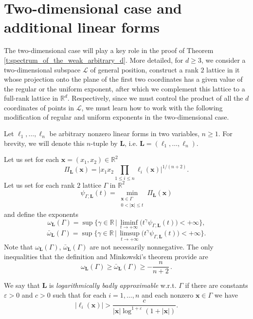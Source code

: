 \documentclass[a4paper,12pt]{article}
\theoremstyle{definition}
\theoremstyle{remark}
\theoremstyle{plain}
\renewcommand{\vec}[1]{\mathbf{#1}}
\renewcommand{\geq}{\geqslant}
\renewcommand{\leq}{\leqslant}
\newcommand{\e}{\varepsilon}
\newcommand{\R}{\mathbb{R}}
\newcommand{\Ga}{\Gamma}
\newcommand{\cL}{\mathcal{L}}
\newcommand{\bL}{\mathbf{L}}
\begin{document}
\section{Two-dimensional case and additional linear forms}\label{sec:2dim_and_additional_forms}


The two-dimensional case will play a key role in the proof of Theorem \ref{t:spectrum_of_the_weak_arbitrary_d}. More detailed, for $d\geq3$, we consider a two-dimensional subspace $\cL$ of general position, construct a rank $2$ lattice in it whose projection onto the plane of the first two coordinates has a given value of the regular or the uniform exponent, after which we complement this lattice to a full-rank lattice in $\R^d$. Respectively, since we must control the product of all the $d$ coordinates of points in $\cL$, we must learn how to work with the following modification of regular and uniform exponents in the two-dimensional case.

Let $\ell_1,\ldots,\ell_n$ be arbitrary nonzero linear forms in two variables, $n\geq1$. For brevity, we will denote this $n$-tuple by $\bL$, i.e. $\bL=(\ell_1,\ldots,\ell_n)$.

Let us set for each $\vec x=(x_1,x_2)\in\R^2$
\[
  \Pi_\bL(\vec x)=\bigg|x_1x_2\prod_{1\leq i\leq n}\ell_i(\vec x)\bigg|^{1/(n+2)}.
\]
Let us set for each rank $2$ lattice $\Ga$ in $\R^2$
\[
  \psi_{\Ga,\bL}(t)=\min_{\substack{ \vec x\in\Ga \\ 0<|\vec x|\leq t}}\Pi_\bL(\vec x)
\]
and define the exponents
\[
  \omega_\bL(\Ga)=\sup\Big\{ \gamma\in\R \,\Big|\, \liminf_{t\to+\infty}\big(t^\gamma\psi_{\Ga,\bL}(t)\big)<+\infty \Big\},
\]
\begin{equation}\label{eq:bar_omega_L_definition}
  \bar\omega_\bL(\Ga)=\sup\Big\{ \gamma\in\R \,\Big|\, \limsup_{t\to+\infty}\big(t^\gamma\psi_{\Ga,\bL}(t)\big)<+\infty \Big\}.
\end{equation}
Note that $\omega_\bL(\Ga)$, $\bar\omega_\bL(\Ga)$ are not necessarily nonnegative. The only inequalities that the definition and Minkowski's theorem provide are
\begin{equation}\label{eq:trivial_inequalities_for_omega_L}
  \omega_\bL(\Ga)\geq\bar\omega_\bL(\Ga)\geq-\frac n{n+2}\,.
\end{equation}

We say that $\bL$ is \emph{logarithmically badly approximable} w.r.t. $\Ga$ if there are constants $\e>0$ and $c>0$ such that for each $i=1,\ldots,n$ and each nonzero $\vec x\in\Ga$ we have
\[
  |\ell_i(\vec x)|>\frac c{|\vec x|\log^{1+\e}(1+|\vec x|)}.
\]
\end{document}
